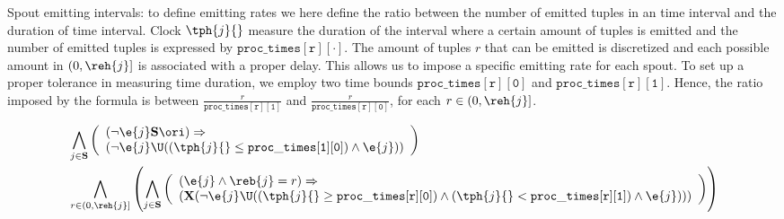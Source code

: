 Spout emitting intervals: to define emitting rates we here define the ratio between the number of emitted tuples in an time interval and the duration of  time interval.
Clock $\tph{j}{}$ measure the duration of the interval where a certain amount of tuples is emitted and the number of emitted tuples is expressed by $\mathtt{proc\_times[r][\cdot]}$.
The amount of tuples $r$ that can be emitted is discretized and each possible amount in $(0, \reh{j}]$ is associated with a proper delay.
This allows us to impose a specific emitting rate for each spout.
To set up a proper tolerance in measuring time duration, we employ two time bounds $\mathtt{proc\_times[r][0]}$ and $\mathtt{proc\_times[r][1]}$.
Hence, the ratio imposed by the formula is between $\frac{r}{\mathtt{proc\_times[r][1]}}$ and $\frac{r}{\mathtt{proc\_times[r][0]}}$, for each $r \in (0, \reh{j}]$.

\begin{align*}
%
&\bigwedge_{
	\begin{subarray}{c}
	j \in \mathbf{S}\\
	\end{subarray}
}
\left( \begin{array}{l}
(\lnot \e{j} \mathbf{S} \ori) \Rightarrow \\
(\lnot \e{j} \U
(( \tph{j}{} \leq \mathtt{proc\_times[1][0]}) \land  \e{j}) )
\end{array} \right)\\
%
%
&\bigwedge_{
	\begin{subarray}{c}
	r \in (0, \reh{j}]\\
	\end{subarray}
}
\left(
\bigwedge_{
	\begin{subarray}{c}
	j \in \mathbf{S}\\
	\end{subarray}
}
\left( \begin{array}{l}
(\e{j} \land \reb{j} = r) \Rightarrow \\
(\mathbf{X}(\lnot \e{j} \U
(( \tph{j}{} \geq \mathtt{proc\_times[r][0]}) \land ( \tph{j}{} < \mathtt{proc\_times[r][1]}) \land  \e{j}) ))
\end{array} \right) \right)\\
\end{align*}

